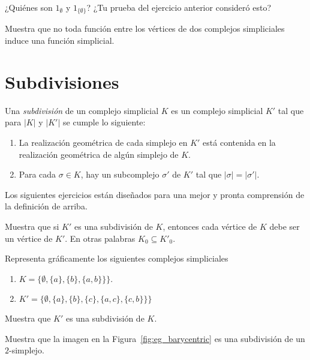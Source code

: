 \documentclass{standalone}
\begin{document}
	\begin{exercise}
		¿Quiénes son $1_{\emptyset}$ y $1_{\{\emptyset\}}$? ¿Tu prueba del ejercicio anterior consideró esto?
	\end{exercise}
	
	\begin{exercise}\label{rem:coeherent_gluing}
		Muestra que no toda función entre los vértices de dos complejos simpliciales induce una función simplicial. 
	\end{exercise}
	
	\section{Subdivisiones}
	\begin{definition}\label{def:subdivision}
		Una \emph{subdivisión} de un complejo simplicial $K$ es un complejo simplicial $K'$ tal que para $|K|$ y $|K'|$ se cumple lo siguiente:
		
		\begin{enumerate}
			\item La realización geométrica de cada simplejo en $K'$ está contenida en la realización geométrica de algún simplejo de $K$.
			\item Para cada $\sigma\in K$, hay un subcomplejo $\sigma'$ de $K'$ tal que $|\sigma|=|\sigma'|$.
		\end{enumerate}
	\end{definition}
	
	Los siguientes ejercicios están diseñados para una mejor y pronta comprensión de la definición de arriba.
	
	\begin{exercise}
		Muestra que si $K'$ es una subdivisión de $K$, entonces cada vértice de $K$ debe ser un vértice de $K'$. En otras palabras $K_{0}\subseteq K'_{0}$.
	\end{exercise}
	
	\begin{exercise}
		Representa gráficamente los siguientes complejos simpliciales
		\begin{enumerate}
			\item  $K=\{\emptyset, \{a\}, \{b\}, \{a,b\}\}\}$.
			\item  $K'=\{\emptyset, \{a\}, \{b\}, \{c\}, \{a,c\}, \{c,b\}\}\}$
		\end{enumerate}
		Muestra que $K'$ es una subdivisión de $K$.
	\end{exercise}
	
	\begin{exercise}
		Muestra que la imagen en la Figura~\ref{fig:eg_barycentric} es una subdivisión de un $2$-simplejo.
	\end{exercise}
	
\end{document}

